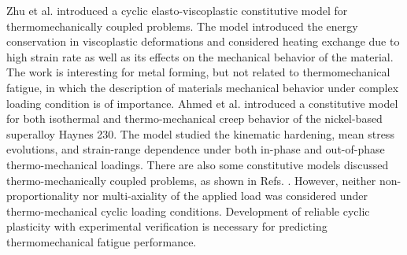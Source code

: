 Zhu et al. \cite{ZHU2016} introduced a cyclic elasto-viscoplastic constitutive model for thermomechanically coupled problems. The model introduced the energy conservation in viscoplastic deformations and considered heating exchange due to high strain rate as well as its effects on the mechanical behavior of the material. The work is interesting for metal forming, but not related to thermomechanical fatigue, in which the description of materials mechanical behavior under complex loading condition is of importance.
Ahmed et al. \cite{Ahmed2016,Ahmed2017} introduced a constitutive model for both isothermal and thermo-mechanical creep behavior of the nickel-based superalloy Haynes 230. The model studied the kinematic hardening, mean stress evolutions, and strain-range dependence under both in-phase and out-of-phase thermo-mechanical loadings.
There are also some constitutive models discussed thermo-mechanically coupled problems, as shown in Refs. \cite{Mao2015,Nieto-Fuentes2018,Wang2017}.
However, neither non-proportionality nor multi-axiality of the applied load was considered under thermo-mechanical cyclic loading conditions.
Development of reliable cyclic plasticity with experimental verification is necessary for predicting thermomechanical fatigue performance.



